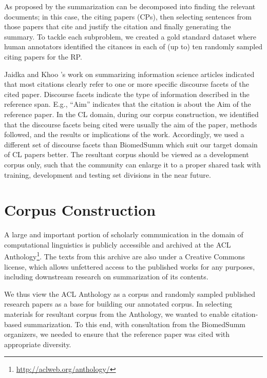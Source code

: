 \documentclass[11pt]{article}
\begin{document}
As proposed by \cite{vu2010,hoang2010} the summarization can be
decomposed into finding the relevant documents; in this case, the
citing papers (CPs), then selecting sentences from those papers that
cite and justify the citation and finally generating the summary. To
tackle each subproblem, we created a gold standard dataset where human
annotators identified the citances in each of (up to) ten randomly sampled
citing papers for the RP.


Jaidka and Khoo 's work on summarizing
information science articles indicated that most citations clearly
refer to one or more specific discourse facets of the cited paper. 
Discourse facets indicate the type of information described in the 
reference span. E.g., ``Aim'' indicates that the citation is about the 
Aim of the reference paper. In the CL domain, during our corpus 
construction, we identified that the discourse facets being cited 
were usually the aim of the paper, methods followed, and the results 
or implications of the work. Accordingly, we used a different set of 
discourse facets than BiomedSumm which suit our target domain of CL 
papers better. The resultant corpus should be viewed as a development 
corpus only, such that the community can enlarge it to a proper shared 
task with training, development and testing set divisions in the near 
future.


\section{Corpus Construction}
\label{corpus}
A large and important portion of scholarly communication in the domain
of computational linguistics is publicly accessible and archived at
the ACL Anthology\footnote{\url{http://aclweb.org/anthology/}}.  The
texts from this archive are also under a Creative Commons license,
which allows unfettered access to the published works for any
purposes, including downstream research on summarization of its
contents.  

We thus view the ACL Anthology as a corpus and randomly sampled
published research papers as a base for building our annotated corpus.
In selecting materials for resultant corpus from the Anthology, we
wanted to enable citation-based summarization. To this end, with
consultation from the BiomedSumm organizers, we needed to ensure that
the reference paper was cited with appropriate diversity.
\end{document}
